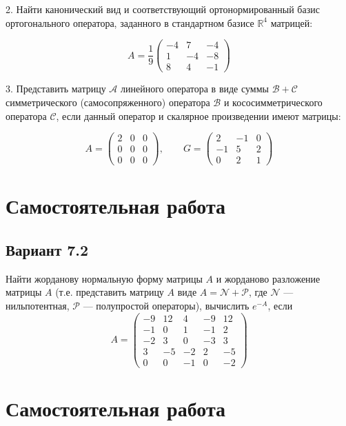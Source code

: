 \documentclass[a4paper]{article}
\begin{document}
2. Найти канонический вид и соответствующий ортонормированный
базис ортогонального оператора, заданного в стандартном базисе
$\mathbb{R}^4$ матрицей:

$$ A= \frac{1}{9}\left(
\begin{array}{rrr}
-4 & 7 & -4 \\
1 & -4 & -8 \\
8 & 4 & -1
\end{array} \right)  $$

3. Представить матрицу $\mathcal{A}$ линейного оператора в виде
суммы $\mathcal{B+C}$ симметрического (самосопряженного) оператора
$\mathcal{B}$ и кососимметрического оператора $\mathcal{C}$, если
данный оператор и скалярное произведении имеют матрицы:

$$ A= \left(
\begin{array}{rrr}
2 & 0 & 0 \\
0 & 0 & 0  \\
0 & 0 & 0
\end{array} \right)  ,\qquad G=
\left(
\begin{array}{rrr}
2& -1 & 0\\
-1 & 5 & 2 \\
0 & 2 & 1
\end{array} \right)  $$

\section{Самостоятельная работа }

\subsection{Вариант 7.2}

Найти жорданову нормальную форму матрицы $A$ и жорданово
разложение матрицы $A$ (т.е. представить матрицу $A$ виде
$A=\mathcal{N} + \mathcal{P}$, где $\mathcal{N}$
--- нильпотентная, $\mathcal{P}$ --- полупростой операторы),
вычислить $e^{-A}$, если
$$
A= \left(
\begin{array}{rrrrr}
-9 & 12 & 4 & -9 & 12 \\
-1 & 0 & 1 & -1 & 2 \\
-2 & 3 & 0 & -3 & 3 \\
3  & -5&-2 &  2 & -5 \\
0 & 0&  -1 & 0  &-2
\end{array} \right)
$$


\section{Самостоятельная работа }
\end{document}
